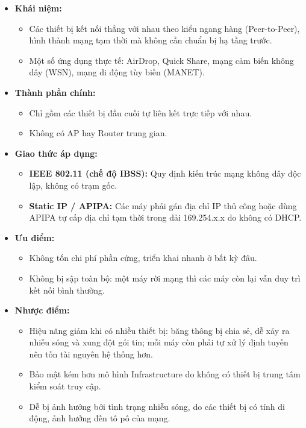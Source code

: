 \begin{itemize}
    \item \textbf{Khái niệm:}
    \begin{itemize}
        \item Các thiết bị kết nối thẳng với nhau theo kiểu ngang hàng 
        (Peer-to-Peer), hình thành mạng tạm thời mà không cần 
        chuẩn bị hạ tầng trước.
        \item Một số ứng dụng thực tế: AirDrop, Quick Share, 
        mạng cảm biến không dây (WSN), mạng di động tùy biến (MANET).
    \end{itemize}

    \item \textbf{Thành phần chính:}
    \begin{itemize}
        \item Chỉ gồm các thiết bị đầu cuối tự liên kết trực tiếp với nhau.
        \item Không có AP hay Router trung gian.
    \end{itemize}

    \item \textbf{Giao thức áp dụng:}
    \begin{itemize}
        \item \textbf{IEEE 802.11 (chế độ IBSS):} 
        Quy định kiến trúc mạng không dây độc lập, không có trạm gốc\cite{ieee80211}.
        \item \textbf{Static IP / APIPA:} 
        Các máy phải gán địa chỉ IP thủ công hoặc dùng APIPA 
        tự cấp địa chỉ tạm thời trong dải 169.254.x.x 
        do không có DHCP.
    \end{itemize}

    \item \textbf{Ưu điểm\cite{geeksforgeeks2023}:}
    \begin{itemize}
        \item Không tốn chi phí phần cứng, triển khai nhanh ở bất kỳ đâu.
        \item Không bị sập toàn bộ: một máy rời mạng thì 
        các máy còn lại vẫn duy trì kết nối bình thường.
    \end{itemize}

    \item \textbf{Nhược điểm\cite{geeksforgeeks2023}:}
    \begin{itemize}
        \item Hiệu năng giảm khi có nhiều thiết bị: băng thông bị chia sẻ,
        dễ xảy ra nhiễu sóng và xung đột gói tin; 
        mỗi máy còn phải tự xử lý định tuyến nên tốn tài nguyên hệ thống hơn.
        \item Bảo mật kém hơn mô hình Infrastructure do không có 
        thiết bị trung tâm kiểm soát truy cập.
        \item Dễ bị ảnh hưởng bởi tình trạng nhiễu sóng, do các thiết bị có tính
        di động, ảnh hưởng đến tô pô của mạng.
    \end{itemize}
\end{itemize}


